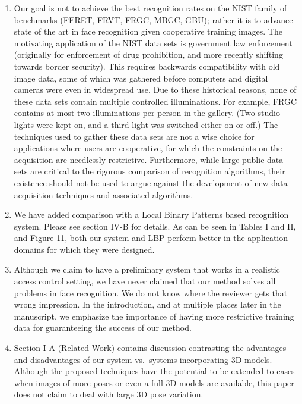 \documentclass[11pt]{article}
\begin{document}
\begin{enumerate}
\item Our goal is not to achieve the best recognition rates on the NIST family
of benchmarks (FERET, FRVT, FRGC, MBGC, GBU); rather it is to advance state of
the art in face recognition given cooperative training images.  The motivating
application of the NIST data sets is government law enforcement (originally for
enforcement of drug prohibition, and more recently shifting towards border
security).  This requires backwards compatibility with old image data, some of
which was gathered before computers and digital cameras were even in widespread
use.  Due to these historical reasons, none of these data sets contain multiple
controlled illuminations.  For example, FRGC contains at most two illuminations
per person in the gallery.  (Two studio lights were kept on, and a third light
was switched either on or off.) The techniques used to gather these data sets
are not a wise choice for applications where users are cooperative, for which
the constraints on the acquisition are needlessly restrictive.  Furthermore,
while large public data sets are critical to the rigorous comparison of
recognition algorithms, their existence should not be used to argue against the
development of new data acquisition techniques and associated algorithms.

\item We have added comparison with a Local Binary Patterns based recognition system.  Please
see section IV-B for details.  As can be seen in Tables I and II, and Figure 11, 
both our system and LBP perform better in the application domains 
for which they were designed.  

\item Although we claim to have a preliminary system that works in a realistic
access control setting, we have never claimed that our method solves all problems in face
recognition. We do not know where the reviewer gets that wrong impression.
In the introduction, and at multiple places later in the manuscript, we emphasize
the importance of having more restrictive training data for guaranteeing the success
of our method.


\item Section I-A (Related Work) contains discussion contrasting the
advantages and disadvantages of our system vs.\ systems incorporating 3D
models.  Although the proposed techniques have the potential to be extended to
cases when images of more poses or even a full 3D models are available, this
paper does not claim to deal with large 3D pose variation.


\end{enumerate}
\end{document}
